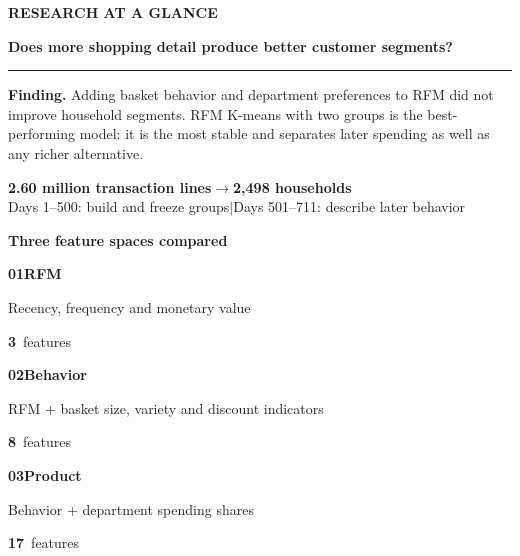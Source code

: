 \thispagestyle{plain}
{\color{ink}\small\bfseries RESEARCH AT A GLANCE}\par
\vspace{2mm}
{\color{ink}\LARGE\bfseries Does more shopping detail produce better customer segments?}\par
\vspace{1mm}
{\color{ink}\rule{\textwidth}{0.8pt}}\par
\vspace{3mm}
\textbf{Finding.} Adding basket behavior and department preferences to RFM did not improve household segments. RFM K-means with two groups is the best-performing model: it is the most stable and separates later spending as well as any richer alternative.

\vfill
\begingroup
\setlength{\fboxsep}{10pt}
\colorbox{ink!7}{\parbox{\dimexpr\textwidth-20pt\relax}{
\centering\large\textbf{2.60 million transaction lines}\quad$\longrightarrow$\quad\textbf{2,498 households}\\[3mm]
\normalsize Days 1--500: build and freeze groups\quad$|$\quad Days 501--711: describe later behavior
}}
\endgroup

\vfill
{\large\bfseries\color{ink} Three feature spaces compared}\par
\vspace{2mm}
\begingroup
\setlength{\fboxsep}{0pt}
\newcommand{\spacecard}[4]{%
  \colorbox{ink!7}{\parbox[t][34mm][t]{\dimexpr(\textwidth-8mm)/3\relax}{%
    \vspace{3mm}\hspace*{3mm}\parbox[t][28mm][t]{\dimexpr(\textwidth-8mm)/3-6mm\relax}{%
      \raggedright{\color{ink}\large\bfseries #1\quad #2}\par\vspace{2mm}
      \small #3\par\vfill
      {\color{ink}\Large\bfseries #4}\ {\small features}}\vspace{3mm}}}}
\noindent\spacecard{01}{RFM}{Recency, frequency and monetary value}{3}\hfill
\spacecard{02}{Behavior}{RFM + basket size, variety and discount indicators}{8}\hfill
\spacecard{03}{Product}{Behavior + department spending shares}{17}
\endgroup

